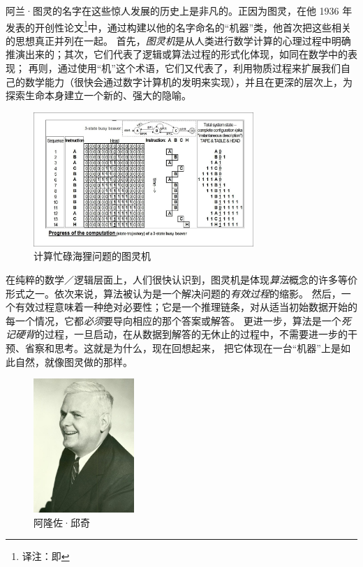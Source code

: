 \documentclass[a4paper,12pt]{article}
\begin{document}
阿兰·图灵的名字在这些惊人发展的历史上是非凡的。正因为图灵，在他 1936 年发表的开创性论文\footnote[3]{译注：即\cite{TuringA1937}}中，通过构建以他的名字命名的“机器”类，他首次把这些相关的思想真正并列在一起。
首先，\emph{\gls{图灵机}}是从人类进行数学计算的心理过程中明确推演出来的；其次，它们代表了逻辑或算法过程的形式化体现，如同在数学中的表现；
再则，通过使用“机”这个术语，它们又代表了，利用物质过程来扩展我们自己的数学能力（很快会通过数字计算机的发明来实现），并且在更深的层次上，为探索生命本身建立一个新的、强大的隐喻。

\begin{figure}[ht]
\centering
\includegraphics[height=2.0in]{images/turing_machine.jpg}
\caption{计算忙碌海狸问题的图灵机}
\end{figure}

在纯粹的数学／逻辑层面上，人们很快认识到，图灵机是体现\emph{\gls{算法}}概念的许多等价形式之一。依次来说，算法被认为是一个解决问题的\emph{\gls{有效过程}}的缩影。
然后，一个有效过程意味着一种绝对必要性；它是一个推理链条，对从适当初始数据开始的每一个情况，它都\emph{必须}要导向相应的那个答案或解答。
更进一步，算法是一个\emph{死记硬背}的过程，一旦启动，在从数据到解答的无休止的过程中，不需要进一步的干预、省察和思考。这就是为什么，现在回想起来，
把它体现在一台“机器”上是如此自然，就像图灵做的那样。

\begin{figure}
  \begin{center}
    \includegraphics[height=2.0in]{images/alonzo_church.jpg}
  \end{center}
  \caption{阿隆佐·邱奇}
\end{figure}
\end{document}
